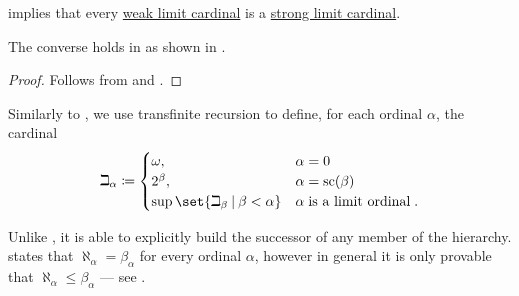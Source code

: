 \begin{corollary}\label{thm:limit_cardinals_and_gch}
   implies that every \hyperref[def:successor_and_limit_cardinal/weak_limit]{weak limit cardinal} is a \hyperref[def:successor_and_limit_cardinal/strong_limit]{strong limit cardinal}.

  The converse holds in  as shown in .
\end{corollary}
\begin{proof}
  Follows from  and .
\end{proof}

\begin{definition}\label{def:beth_hierarchy}
  Similarly to , we use transfinite recursion to define, for each ordinal \( \alpha \), the cardinal
  \begin{equation}\label{eq:def:beth_hierarchy}
    \beth_\alpha \coloneqq \begin{cases}
      \omega,                                       &\alpha = 0 \\
      2^\beta,                                      &\alpha = \op{sc}(\beta) \\
      \sup\set{ \beth_\beta \given \beta < \alpha } &\alpha \T{is a limit ordinal}.
    \end{cases}
  \end{equation}

  Unlike , it is able to explicitly build the successor of any member of the hierarchy.  states that \( \aleph_\alpha = \beta_\alpha \) for every ordinal \( \alpha \), however in general it is only provable that \( \aleph_\alpha \leq \beta_\alpha \) --- see .
\end{definition}

